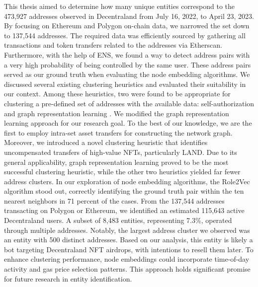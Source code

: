 \documentclass[12pt,a4paper,titlepage,oneside,english]{article}
\begin{document}
This thesis aimed to determine how many unique entities correspond to the 473,927 addresses observed in Decentraland from July 16, 2022, to April 23, 2023. \newline
By focusing on Ethereum and Polygon on-chain data, we narrowed the set down to 137,544 addresses. The required data was efficiently sourced by gathering all transactions and token transfers related to the addresses via Etherscan. Furthermore, with the help of ENS, we found a way to detect address pairs with a very high probability of being controlled by the same user. These address pairs served as our ground truth when evaluating the node embedding algorithms. \newline
We discussed several existing clustering heuristics and evaluated their suitability in our context. Among these heuristics, two were found to be appropriate for clustering a pre-defined set of addresses with the available data: self-authorization \citep{FV:17} and graph representation learning \citep{Beres2020}. We modified the graph representation learning approach for our research goal. %
To the best of our knowledge, we are the first to employ intra-set asset transfers for constructing the network graph. Moreover, we introduced a novel clustering heuristic that identifies uncompensated transfers of high-value NFTs, particularly LAND. \newline
Due to its general applicability, graph representation learning proved to be the most successful clustering heuristic, while the other two heuristics yielded far fewer address clusters. In our exploration of node embedding algorithms, the Role2Vec algorithm stood out, correctly identifying the ground truth pair within the ten nearest neighbors in 71 percent of the cases. \newline
From the 137,544 addresses transacting on Polygon or Ethereum, we identified an estimated 115,643 active Decentraland users. A subset of 8,483 entities, representing 7.3\%, operated through multiple addresses. Notably, the largest address cluster we observed was an entity with 500 distinct addresses. Based on our analysis, this entity is likely a bot targeting Decentraland NFT airdrops, with intentions to resell them later. \newline
To enhance clustering performance, node embeddings could incorporate time-of-day activity and gas price selection patterns. This approach holds significant promise for future research in entity identification. \newline
\end{document}
